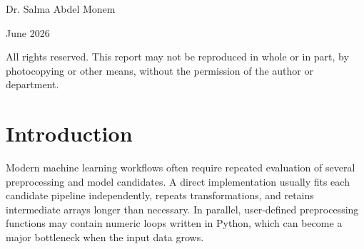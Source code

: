 \documentclass[12pt,a4paper,oneside]{report}
\begin{document}
\begin{titlepage}
\begin{center}
\vspace{0.25cm}

{\fontsize{14}{16}\selectfont Dr. Salma Abdel Monem}

\vspace{0.45cm}

{\fontsize{12}{14}\selectfont June 2026}

\vfill

{\fontsize{11}{14}\selectfont
All rights reserved. This report may not be reproduced in whole or in part,
by photocopying or other means, without the permission of the author or department.
}

\end{center}
\end{titlepage}

\begin{abstract}
This paper describes two core modules of Accelera: accelera\_pipe, 
a graph-based machine learning pipeline executor, and the Parallelizer, a source-to-source loop optimization 
module that emits OpenMP-enabled C++ for supported code patterns. The pipeline module represents preprocessing, 
model fitting, prediction, metrics, branching, merging, and executed inference graphs as a native backend graph. 
This representation enables parallel branch execution, path selection, graph reuse, and targeted memory optimizations. 
The Parallelizer converts supported Python code to C++, extracts loops, classifies safe OpenMP transformations,
 inserts pragmas, and can compile custom preprocessing functions into Python-callable native extensions. 
 Experiments show that accelera\_pipe preserves sklearn-equivalent accuracy while reducing latency on a
  large four-candidate model-selection benchmark from about 803 seconds to 495 seconds. The Parallelizer also 
  accelerates hard loop examples and reduces a preprocessing-heavy Python kernel from 6.83 seconds to 0.08 seconds 
  in a repeated cached end-to-end pipeline run.\end{abstract}

\tableofcontents
\listoffigures
\listoftables
\clearpage

\chapter{Introduction}
\label{chap:introduction}
Modern machine learning workflows often require repeated evaluation of several
preprocessing and model candidates. A direct implementation usually fits each
candidate pipeline independently, repeats transformations, and retains
intermediate arrays longer than necessary. In parallel, user-defined
preprocessing functions may contain numeric loops written in Python, which can
become a major bottleneck when the input data grows.
\end{document}
